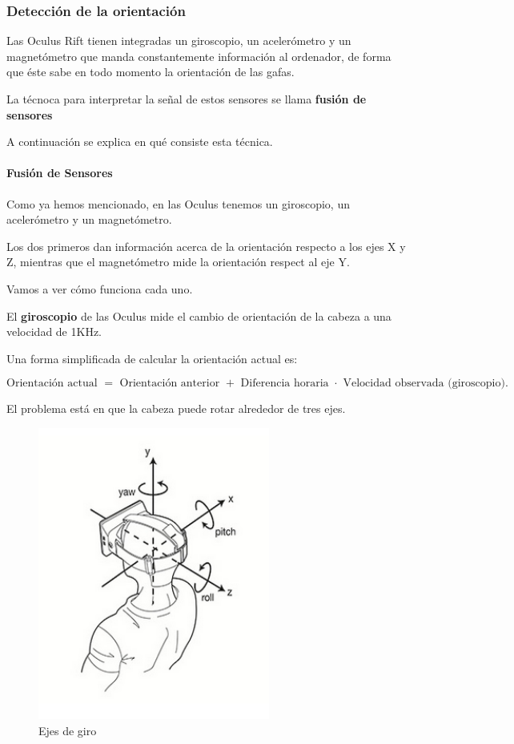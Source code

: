 \documentclass[twoside, 12pt]{epstfg}
\begin{document}
\subsubsection{Detección de la orientación}



Las Oculus Rift tienen integradas un giroscopio, un acelerómetro y un magnetómetro que manda constantemente información al ordenador, de forma que éste sabe en todo momento la orientación de las gafas.

La técnoca para interpretar la señal de estos sensores se llama \textbf{fusión de sensores}

A continuación se explica en qué consiste esta técnica.

\paragraph{Fusión de Sensores }

Como ya hemos mencionado, en las Oculus tenemos un giroscopio, un acelerómetro y un magnetómetro.

Los dos primeros dan información acerca de la orientación respecto a los ejes X y Z, mientras que el magnetómetro mide la orientación respect al eje Y.

Vamos a ver cómo funciona cada uno.

El \textbf{giroscopio} de las Oculus mide el cambio de orientación de la cabeza a una velocidad de 1KHz.

Una forma simplificada de calcular la orientación actual es:

$$\text{Orientación actual } = \text{ Orientación anterior } + \text{ Diferencia horaria } \cdot \text{ Velocidad observada (giroscopio).}$$

El problema está en que la cabeza puede rotar alrededor de tres ejes.

\begin{figure}[h]
	\centerline{
		\mbox{\includegraphics[width=3.00in]{images/headtracking.png}}
	}
	\caption{Ejes de giro}
\end{figure}
\end{document}
